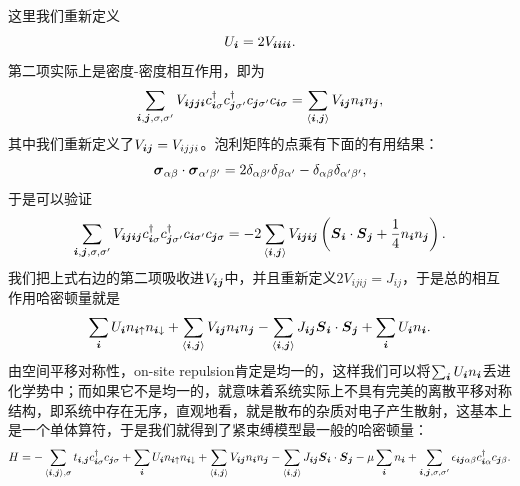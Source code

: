 这里我们重新定义
\begin{equation}
    U_{\vb*{i}} = 2 V_{\vb*{i} \vb*{i} \vb*{i} \vb*{i}}.
\end{equation}
第二项实际上是密度-密度相互作用，即为
\[
    \sum_{\vb*{i}, \vb*{j}, \sigma, \sigma'} V_{\vb*{i} \vb*{j} \vb*{j} \vb*{i}} c^\dagger_{\vb*{i} \sigma} c^\dagger_{\vb*{j} \sigma'} c_{\vb*{j} \sigma'} c_{\vb*{i} \sigma} = \sum_{\langle \vb*{i}, \vb*{j} \rangle} V_{\vb*{i} \vb*{j}}n_{\vb*{i}} n_{\vb*{j}},
\]
其中我们重新定义了$V_{\vb*{i} \vb*{j}} = V_{ijji}$。泡利矩阵的点乘有下面的有用结果：
\begin{equation}
    \vb*{\sigma}_{\alpha \beta} \cdot \vb*{\sigma}_{\alpha' \beta'} = 2 \delta_{\alpha \beta'} \delta_{\beta \alpha'} - \delta_{\alpha \beta} \delta_{\alpha' \beta'},
    \label{eq:pauli-dot-product}
\end{equation}
于是可以验证
\[
    \sum_{\vb*{i}, \vb*{j}, \sigma, \sigma'} V_{\vb*{i} \vb*{j} \vb*{i} \vb*{j}} c^\dagger_{\vb*{i} \sigma} c^\dagger_{\vb*{j} \sigma'} c_{\vb*{i} \sigma'} c_{\vb*{j} \sigma} = - 2 \sum_{\langle \vb*{i}, \vb*{j} \rangle} V_{\vb*{i} \vb*{j} \vb*{i} \vb*{j}} \left( \vb*{S}_{\vb*{i}} \cdot \vb*{S}_{\vb*{j}} + \frac{1}{4}n_{\vb*{i}} n_{\vb*{j}} \right).
\]
我们把上式右边的第二项吸收进$V_{\vb*{i} \vb*{j}}$中，并且重新定义$2V_{ijij}=J_{ij}$，于是总的相互作用哈密顿量就是
\[
    \sum_{\vb*{i}} U_{\vb*{i}} n_{\vb*{i} \uparrow} n_{\vb*{i} \downarrow} + \sum_{\langle \vb*{i}, \vb*{j} \rangle} V_{\vb*{i} \vb*{j}}n_{\vb*{i}} n_{\vb*{j}} - \sum_{\langle \vb*{i}, \vb*{j} \rangle} J_{\vb*{i} \vb*{j}} \vb*{S}_{\vb*{i}} \cdot \vb*{S}_{\vb*{j}} + \sum_{\vb*{i}} U_{\vb*{i}}n_{\vb*{i}}.
\]
由空间平移对称性，on-site repulsion肯定是均一的，这样我们可以将$\sum_{\vb*{i}} U_{\vb*{i}}n_{\vb*{i}}$丢进化学势中；而如果它不是均一的，就意味着系统实际上不具有完美的离散平移对称结构，即系统中存在无序，直观地看，就是散布的杂质对电子产生散射，这基本上是一个单体算符，于是我们就得到了紧束缚模型最一般的哈密顿量：
\begin{equation}
    H = - \sum_{\langle \vb*{i}, \vb*{j} \rangle, \sigma} t_{\vb*{i}, \vb*{j}} c^\dagger_{\vb*{i} \sigma} c_{\vb*{j} \sigma} 
    + \sum_{\vb*{i}} U_{\vb*{i}} n_{\vb*{i} \uparrow} n_{\vb*{i} \downarrow} 
    + \sum_{\langle \vb*{i}, \vb*{j} \rangle} V_{\vb*{i} \vb*{j}} n_{\vb*{i}} n_{\vb*{j}} - \sum_{\langle \vb*{i}, \vb*{j} \rangle} J_{\vb*{i} \vb*{j}} \vb*{S}_{\vb*{i}} \cdot \vb*{S}_{\vb*{j}} 
    - \mu \sum_{\vb*{i}} n_{\vb*{i}} + \sum_{\vb*{i}, \vb*{j}, \sigma, \sigma'} \epsilon_{\vb*{i} \vb*{j} \alpha \beta} c^\dagger_{\vb*{i} \alpha} c_{\vb*{j} \beta}.  
    \label{eq:tight-binding-single-band-interaction}
\end{equation}

